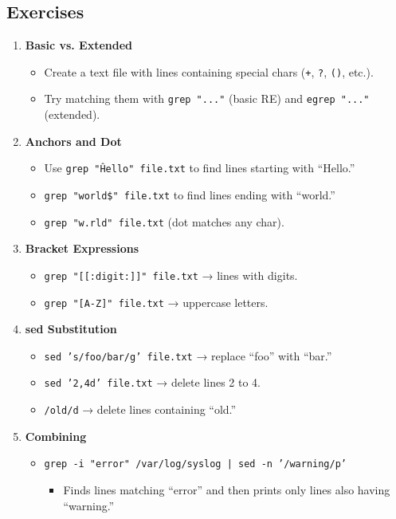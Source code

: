 \documentclass[a4paper]{report}
\begin{document}
\subsection*{Exercises}
\begin{enumerate}
    \item \textbf{Basic vs. Extended}
    \begin{itemize}
        \item Create a text file with lines containing special chars (\texttt{+}, \texttt{?}, \texttt{()}, etc.).
        \item Try matching them with \texttt{grep "..."} (basic RE) and \texttt{egrep "..."} (extended).
    \end{itemize}

    \item \textbf{Anchors and Dot}
    \begin{itemize}
        \item Use \texttt{grep "\^Hello" file.txt} to find lines starting with “Hello.”
        \item \texttt{grep "world\$" file.txt} to find lines ending with “world.”
        \item \texttt{grep "w.rld" file.txt} (dot matches any char).
    \end{itemize}

    \item \textbf{Bracket Expressions}
    \begin{itemize}
        \item \texttt{grep "[[:digit:]]" file.txt} → lines with digits.
        \item \texttt{grep "[A-Z]" file.txt} → uppercase letters.
    \end{itemize}

    \item \textbf{sed Substitution}
    \begin{itemize}
        \item \texttt{sed 's/foo/bar/g' file.txt} → replace “foo” with “bar.”
        \item \texttt{sed '2,4d' file.txt} → delete lines 2 to 4.
        \item \texttt{/old/d} → delete lines containing “old.”
    \end{itemize}

    \item \textbf{Combining}
    \begin{itemize}
        \item \texttt{grep -i "error" /var/log/syslog | sed -n '/warning/p'}  
        \begin{itemize}
        \item Finds lines matching “error” and then prints only lines also having “warning.”
    \end{itemize}
\end{itemize}


\end{enumerate}
\end{document}
